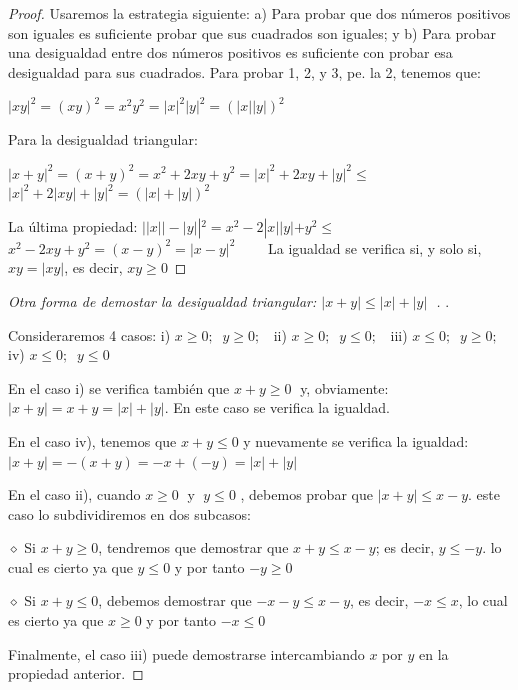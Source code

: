 	\begin{proof}
		Usaremos la estrategia siguiente: a) Para probar que dos números positivos son iguales es suficiente probar que sus cuadrados son iguales; y b) Para probar una desigualdad entre dos números positivos es suficiente con probar esa desigualdad para sus cuadrados.
		Para probar 1, 2, y 3, pe. la 2, tenemos que: 
		
		$|xy|^2=(xy)^2=x^2y^2=|x|^2 |y|^2=\left( |x||y|\right)^2 $
		
		\vspace{2mm}\hspace{-7mm}
		Para la desigualdad triangular:
		
		$|x+y|^2=(x+y)^2=x^2+2xy+y^2=|x|^2+2xy+|y|^2\le $
		$|x|^2+2|xy|+|y|^2= \left( |x|+|y| \right)^2$
		
		\vspace{2mm}\hspace{-7mm}
		La última propiedad: $||x||-|y||^2=x^2-2|x||y|+y^2\le $
		$ x^2 - 2 x y +y^2=(x-y)^2=|x-y|^2 \qquad$ La igualdad se verifica si, y solo si, $xy=|xy|$, es decir, $xy\ge 0$
		\end{proof}
		
		
		
		\begin{proof}[Otra forma de demostar la desigualdad triangular: $|x+y|\le|x|+|y|\;$ ].
		
		
		 Consideraremos 4 casos:
			 i) $x\ge0;\;\;y\ge0;\; \; $
			 ii) $x\ge0;\;\;y\le0;\; \; $
			 iii) $x\le0;\;\;y\ge0;\; \; $
			 iv) $x\le0;\;\;y\le0$	
			
			
			En el caso i) se verifica también que $x+y\ge0\;$ y, obviamente: $|x+y|=x+y=|x|+|y|$. En este caso se verifica la igualdad.
			
			En el caso iv), tenemos que $x+y\le 0$ y nuevamente se verifica la igualdad: $|x+y|=-(x+y)=-x+(-y)=|x|+|y|$
			
			 En el caso ii), cuando $x\ge 0\; $ y $\; y\le0$ , debemos probar que $|x+y|\le x - y$. este caso lo subdividiremos en dos subcasos:
			
			\hspace{10mm}$\diamond$  Si $x+y\ge 0$, tendremos que demostrar que $x+y\le x-y$; es decir, $y\le -y$. lo cual es cierto ya que $y\le 0$ y por tanto $-y\ge 0$
			
			\hspace{10mm}$\diamond$ Si $x+y\le 0$, debemos demostrar que $-x-y\le x-y$, es decir, $-x\le x$, lo cual es cierto ya que $x\ge 0$ y por tanto $-x\le 0$
			
			 Finalmente, el caso iii) puede demostrarse intercambiando $x$ por $y$ en la propiedad anterior. 
		\end{proof}
		
